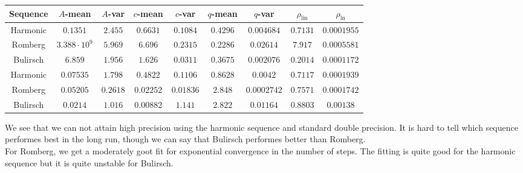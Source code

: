 \begin{table}[H]
    \centering
    \small
    \begin{tabular}{c||c|c|c|c|c|c|c|c}
Sequence & \(A\)-mean & \(A\)-var & \(c\)-mean & \(c\)-var & \(q\)-mean & \(q\)-var & \(\rho_{\operatorname{lin}}\) & \(\rho_{\ln}\)\\\hline
\rowcolor{yellow}
Harmonic & \(0.1351\) & \(2.455\) & \(0.6631\) & \(0.1084\) & \(0.4296\) & \(0.004684\) & \(0.7131\) & \(0.0001955\) \\
\rowcolor{red}
Romberg & \(3.388\cdot 10^9\) & \(5.969\) & \(6.696\) & \(0.2315\) & \(0.2286\) & \(0.02614\) & \(7.917\) & \(0.0005581\) \\
\rowcolor{yellow}
Bulirsch & \(6.859\) & \(1.956\) & \(1.626\) & \(0.0311\) & \(0.3675\) & \(0.002076\) & \(0.2014\) & \(0.0001172\) \\
\rowcolor{yellow}
Harmonic & \(0.07535\) & \(1.798\) & \(0.4822\) & \(0.1106\) & \(0.8628\) & \(0.0042\) & \(0.7117\) & \(0.0001939\) \\
\rowcolor{yellow}
Romberg & \(0.05205\) & \(0.2618\) & \(0.02252\) & \(0.01836\) & \(2.848\) & \(0.0002742\) & \(0.7571\) & \(0.0001742\) \\
\rowcolor{red}
Bulirsch & \(0.0214\) & \(1.016\) & \(0.00882\) & \(1.141\) & \(2.822\) & \(0.01164\) & \(0.8803\) & \(0.00138\) \\
    \end{tabular}
    \label{tab:my_label}
\end{table}

We see that we can not attain high precision using the harmonic sequence and standard double precision. It is hard to tell which sequence performes best in the long run, though we can say that Bulirsch performes better than Romberg.\\

For Romberg, we get a moderately goot fit for exponential convergence in the number of steps. The fitting is quite good for the harmonic sequence but it is quite unstable for Bulirsch.

